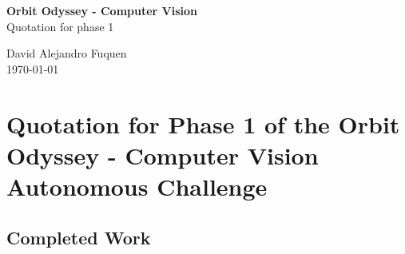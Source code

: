 \documentclass[a4]{article}
\begin{document}
\thispagestyle{fancy}

\begin{center}
    \textbf{\large Orbit Odyssey - Computer Vision} \\
    {Quotation for phase 1}
    
    \vspace{0.7em}

    David Alejandro Fuquen \\

    {\small \today}

\end{center}

\section*{Quotation for Phase 1 of the Orbit Odyssey - Computer Vision Autonomous Challenge}


\subsection*{Completed Work}
\end{document}
